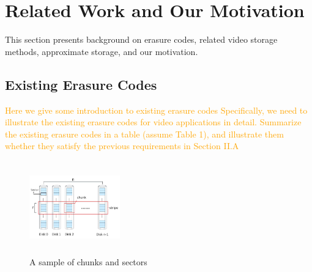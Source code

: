 \documentclass[sigconf]{acmart}
\begin{document}
\section{Related Work and Our Motivation}\label{RelatedWork}
This section presents background on erasure codes, related video storage methods, approximate storage, and our motivation.

\subsection{Existing Erasure Codes}

\textcolor{orange}{Here we give some introduction to existing erasure codes
Specifically, we need to illustrate the existing erasure codes for video applications in detail.
Summarize the existing erasure codes in a table (assume Table 1), and illustrate them whether they satisfy the previous requirements in Section II.A}


\begin{figure}[ht]
\centering
\includegraphics[width=0.35\textwidth,height=40mm]{photo/chunk-sector.JPG}
\caption{A sample of chunks and sectors}
\label{chunk-sector}
\end{figure}
\end{document}
